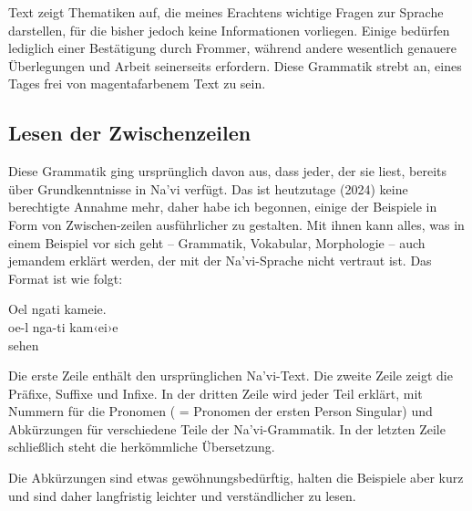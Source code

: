 Text  zeigt Thematiken auf, die meines Erachtens wichtige Fragen zur Sprache darstellen, für die bisher jedoch keine Informationen vorliegen. Einige bedürfen lediglich einer Bestätigung durch Frommer, während andere wesentlich genauere Überlegungen und
Arbeit seinerseits erfordern. Diese Grammatik strebt an, eines Tages frei von magentafarbenem Text zu sein.

\subsection{Lesen der Zwischenzeilen}
Diese Grammatik ging ursprünglich davon aus, dass jeder, der sie liest, bereits über Grundkenntnisse in Na'vi verfügt. Das ist heutzutage (2024) keine berechtigte Annahme mehr, daher habe ich begonnen, einige der Beispiele in Form von Zwischen-zeilen ausführlicher zu gestalten. Mit ihnen kann alles, was in einem Beispiel vor sich geht -- Grammatik, Vokabular, Morphologie -- auch jemandem erklärt werden, der mit der Na'vi-Sprache nicht vertraut ist. Das Format ist wie folgt:

\begin{interlin}
	\glll Oel ngati kameie. \\
	oe-l nga-ti kam‹ei›e \\
	  sehen \\
\end{interlin}

\noindent Die erste Zeile enthält den ursprünglichen Na'vi-Text. Die zweite Zeile zeigt die Präfixe, Suffixe und Infixe. In der dritten Zeile wird jeder Teil erklärt, mit Nummern für die Pronomen ( = Pronomen der ersten Person Singular) und Abkürzungen für verschiedene Teile der Na'vi-Grammatik. In der letzten Zeile schließlich steht die herkömmliche Übersetzung. 

Die Abkürzungen sind etwas gewöhnungsbedürftig, halten die Beispiele aber kurz und sind daher langfristig leichter und verständlicher zu lesen.

